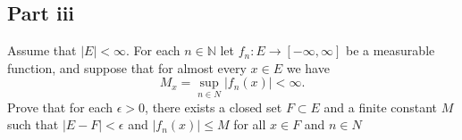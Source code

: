 \subsection{Part iii}

\begin{question}
   Assume that $|E|<\infty$. For each $n \in \mathbb{N}$ let $f_n: E \rightarrow[-\infty, \infty]$ be a measurable function, and suppose that for almost every $x \in E$ we have
    $$
    M_x=\sup _{n \in N}\left|f_n(x)\right|<\infty .
    $$
    Prove that for each $\epsilon>0$, there exists a closed set $F \subset E$ and a finite constant $M$ such that $|E-F|<\epsilon$ and $\left|f_n(x)\right| \leq M$ for all $x \in F$ and $n \in N$
\end{question}

\begin{answer}
    
\end{answer}